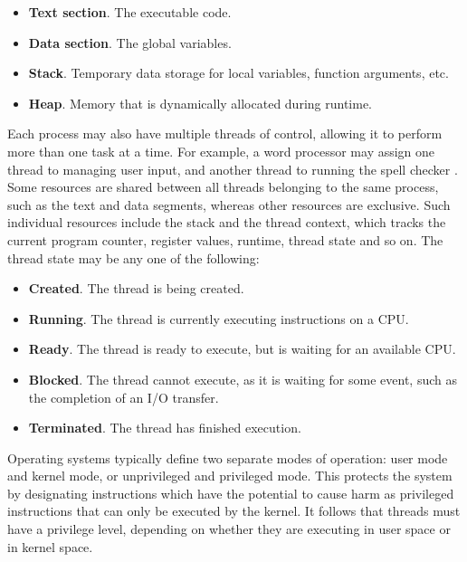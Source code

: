 \documentclass[bsc,frontabs,singlespacing,parskip,deptreport]{infthesis}
\begin{document}
\begin{itemize}
    \item{\textbf{Text section}. The executable code.}
    \item{\textbf{Data section}. The global variables.}
    \item{\textbf{Stack}. Temporary data storage for local variables, function arguments, etc.}
    \item{\textbf{Heap}. Memory that is dynamically allocated during runtime.}
\end{itemize}

Each process may also have multiple threads of control, allowing it to perform more than one task at a time. For example, a word processor may assign one thread to managing user input, and another thread to running the spell checker \cite{silberschatz}. Some resources are shared between all threads belonging to the same process, such as the text and data segments, whereas other resources are exclusive. Such individual resources include the stack and the thread context, which tracks the current program counter, register values, runtime, thread state and so on. The thread state may be any one of the following:

\begin{itemize}
    \item{\textbf{Created}. The thread is being created.}
    \item{\textbf{Running}. The thread is currently executing instructions on a CPU.}
    \item{\textbf{Ready}. The thread is ready to execute, but is waiting for an available CPU.}
    \item{\textbf{Blocked}. The thread cannot execute, as it is waiting for some event, such as the completion of an I/O transfer.}
    \item{\textbf{Terminated}. The thread has finished execution.}
\end{itemize}

Operating systems typically define two separate modes of operation: user mode and kernel mode, or unprivileged and privileged mode. This protects the system by designating instructions which have the potential to cause harm as privileged instructions that can only be executed by the kernel. It follows that threads must have a privilege level, depending on whether they are executing in user space or in kernel space.
\end{document}
